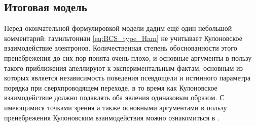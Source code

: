 \subsection{Итоговая модель}
Перед окончательной формулировкой модели дадим ещё один небольшой комментарий: гамильтониан \eqref{eq:BCS_type_Ham} не учитывает Кулоновское взаимодействие электронов. Количественная степень обоснованности этого пренебрежения до сих пор понята очень плохо, и основные аргументы в пользу такого приближения апеллируют к экспериментальным фактам, основным из которых является независимость поведения псевдощели и истинного параметра порядка при сверхпроводящем переходе, в то время как Кулоновское взаимодействие должно подавлять оба явления одинаковым образом. С имеющимися точками зрения а также основными аргументами в пользу пренебрежения Кулоновским взаимодействия можно ознакомиться в \cite{Feigelman2010}.

